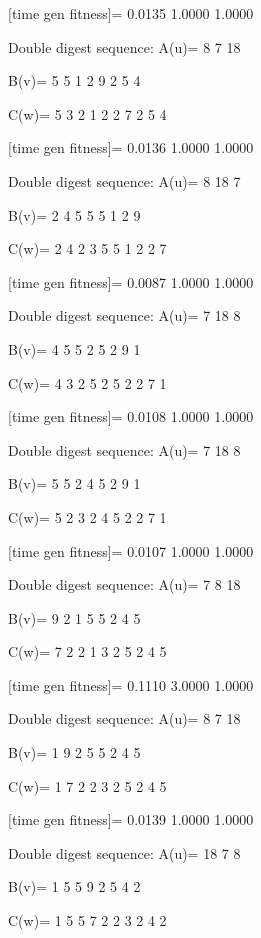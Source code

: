 [time gen fitness]=
    0.0135    1.0000    1.0000

Double digest sequence:
A(u)=
     8     7    18

B(v)=
     5     5     1     2     9     2     5     4

C(w)=
     5     3     2     1     2     2     7     2     5     4

[time gen fitness]=
    0.0136    1.0000    1.0000

Double digest sequence:
A(u)=
     8    18     7

B(v)=
     2     4     5     5     5     1     2     9

C(w)=
     2     4     2     3     5     5     1     2     2     7

[time gen fitness]=
    0.0087    1.0000    1.0000

Double digest sequence:
A(u)=
     7    18     8

B(v)=
     4     5     5     2     5     2     9     1

C(w)=
     4     3     2     5     2     5     2     2     7     1

[time gen fitness]=
    0.0108    1.0000    1.0000

Double digest sequence:
A(u)=
     7    18     8

B(v)=
     5     5     2     4     5     2     9     1

C(w)=
     5     2     3     2     4     5     2     2     7     1

[time gen fitness]=
    0.0107    1.0000    1.0000

Double digest sequence:
A(u)=
     7     8    18

B(v)=
     9     2     1     5     5     2     4     5

C(w)=
     7     2     2     1     3     2     5     2     4     5

[time gen fitness]=
    0.1110    3.0000    1.0000

Double digest sequence:
A(u)=
     8     7    18

B(v)=
     1     9     2     5     5     2     4     5

C(w)=
     1     7     2     2     3     2     5     2     4     5

[time gen fitness]=
    0.0139    1.0000    1.0000

Double digest sequence:
A(u)=
    18     7     8

B(v)=
     1     5     5     9     2     5     4     2

C(w)=
     1     5     5     7     2     2     3     2     4     2

